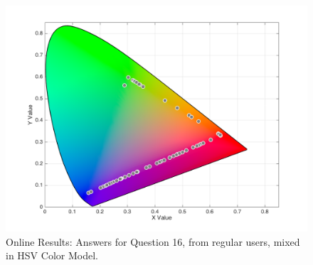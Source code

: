 \begin{figure}[htbp]
\begin{minipage}{0.48\textwidth}
    \includegraphics[width=\textwidth]{images/results/16_online_HSVresponses.png}
    \caption[Online Results: Answers for Question 16, from regular users, mixed in HSV Color Model.]{Online Results: Answers for Question 16, from regular users, mixed in HSV Color Model.}
    \label{fig:onlinehsvregular_16}
  \end{minipage}
\end{figure}
%
